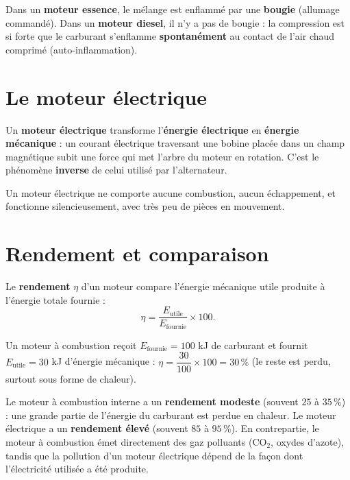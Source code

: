 \begin{propriete}
Dans un \textbf{moteur essence}, le mélange est enflammé par une \textbf{bougie}
(allumage commandé). Dans un \textbf{moteur diesel}, il n'y a pas de bougie : la
compression est si forte que le carburant s'enflamme \textbf{spontanément} au contact de
l'air chaud comprimé (auto-inflammation).
\end{propriete}

\section{Le moteur électrique}

\begin{definition}
Un \textbf{moteur électrique} transforme l'\textbf{énergie électrique} en
\textbf{énergie mécanique} : un courant électrique traversant une bobine placée dans un
champ magnétique subit une force qui met l'arbre du moteur en rotation. C'est le
phénomène \textbf{inverse} de celui utilisé par l'alternateur.
\end{definition}

\begin{remarque}
Un moteur électrique ne comporte aucune combustion, aucun échappement, et fonctionne
silencieusement, avec très peu de pièces en mouvement.
\end{remarque}

\section{Rendement et comparaison}

\begin{definition}
Le \textbf{rendement} $\eta$ d'un moteur compare l'énergie mécanique utile produite à
l'énergie totale fournie :
\[
\eta=\frac{E_{\text{utile}}}{E_{\text{fournie}}}\times100.
\]
\end{definition}

\begin{exemple}
Un moteur à combustion reçoit $E_{\text{fournie}}=100$ kJ de carburant et fournit
$E_{\text{utile}}=30$ kJ d'énergie mécanique : $\eta=\dfrac{30}{100}\times100=30\,\%$
(le reste est perdu, surtout sous forme de chaleur).
\end{exemple}

\begin{propriete}
Le moteur à combustion interne a un \textbf{rendement modeste} (souvent $25$ à
$35\,\%$) : une grande partie de l'énergie du carburant est perdue en chaleur. Le moteur
électrique a un \textbf{rendement élevé} (souvent $85$ à $95\,\%$). En contrepartie, le
moteur à combustion émet directement des gaz polluants ($\mathrm{CO_2}$, oxydes d'azote),
tandis que la pollution d'un moteur électrique dépend de la façon dont l'électricité
utilisée a été produite.
\end{propriete}

